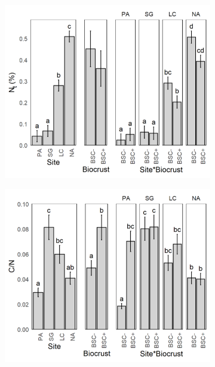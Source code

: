 \begin{figure}[htbp]
    \begin{subfigure}[b]{0.32\textwidth}
        \centering
        \includegraphics[width=\linewidth]{img/M1-Figure_2-07.png}
    \end{subfigure}
    \hfill
    \begin{subfigure}[b]{0.32\textwidth}
        \centering
        \includegraphics[width=\linewidth]{img/M1-Figure_2-08.png}
    \end{subfigure}
    \hfill
    \begin{subfigure}[b]{0.32\textwidth}

\end{subfigure}
\end{figure}
